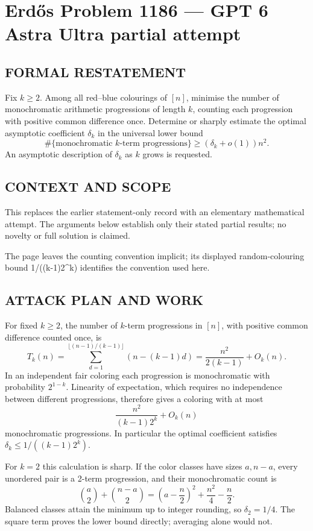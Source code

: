 \section*{Erd\H{o}s Problem 1186 --- GPT 6 Astra Ultra partial attempt}


\subsection*{FORMAL RESTATEMENT}
Fix $k\geq2$. Among all red--blue colourings of $[n]$, minimise the number of monochromatic arithmetic progressions of length $k$, counting each progression with positive common difference once. Determine or sharply estimate the optimal asymptotic coefficient $\delta_k$ in the universal lower bound
\[\#\{\text{monochromatic }k\text{-term progressions}\}\geq (\delta_k+o(1))n^2.\]
An asymptotic description of $\delta_k$ as $k$ grows is requested.

\subsection*{CONTEXT AND SCOPE}
This replaces the earlier statement-only record with an elementary mathematical attempt. The arguments below establish only their stated partial results; no novelty or full solution is claimed.

The page leaves the counting convention implicit; its displayed random-colouring bound 1/((k-1)2^k) identifies the convention used here.

\subsection*{ATTACK PLAN AND WORK}
For fixed $k\ge2$, the number of $k$-term progressions in $[n]$, with positive
common difference counted once, is
\[T_k(n)=\sum_{d=1}^{\lfloor(n-1)/(k-1)\rfloor}(n-(k-1)d)
=\frac{n^2}{2(k-1)}+O_k(n).\tag{1}\]
In an independent fair coloring each progression is monochromatic with
probability $2^{1-k}$. Linearity of expectation, which requires no independence
between different progressions, therefore gives a coloring with at most
\[\frac{n^2}{(k-1)2^k}+O_k(n)\]
monochromatic progressions. In particular the optimal coefficient satisfies
$\delta_k\le1/((k-1)2^k)$.

For $k=2$ this calculation is sharp. If the color classes have sizes $a,n-a$,
every unordered pair is a 2-term progression, and their monochromatic count is
\[\binom a2+\binom{n-a}2
=\left(a-\frac n2\right)^2+\frac{n^2}{4}-\frac n2.\]
Balanced classes attain the minimum up to integer rounding, so $\delta_2=1/4$.
The square term proves the lower bound directly; averaging alone would not.

